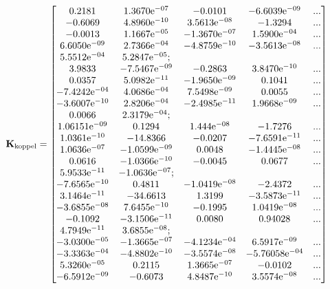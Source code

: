 \begin{equation*}
{\ensuremath{\boldsymbol{\mathrm{K}}}}_{\textnormal{koppel}} = 
\begin{bmatrix}
0.2181 & 1.3670\mathrm{e}^{-07} & -0.0101 & -6.6039\mathrm{e}^{-09} & ... \\
-0.6069 & 4.8960\mathrm{e}^{-10} & 3.5613\mathrm{e}^{-08} & -1.3294 & ... \\
-0.0013 & 1.1667\mathrm{e}^{-05} & -1.3670\mathrm{e}^{-07} & 1.5900\mathrm{e}^{-04} & ... \\
6.6050\mathrm{e}^{-09} & 2.7366\mathrm{e}^{-04} & -4.8759\mathrm{e}^{-10} & -3.5613\mathrm{e}^{-08} & ... \\
5.5512\mathrm{e}^{-04} & 5.2847\mathrm{e}^{-05}; & & \\ 
3.9833 & -7.5467\mathrm{e}^{-09} & -0.2863 & 3.8470\mathrm{e}^{-10} & ... \\ 
0.0357 & 5.0982\mathrm{e}^{-11} & -1.9650\mathrm{e}^{-09} & 0.1041 & ... \\
-7.4242\mathrm{e}^{-04} & 4.0686\mathrm{e}^{-04} & 7.5498\mathrm{e}^{-09} & 0.0055 & ... \\
-3.6007\mathrm{e}^{-10} & 2.8206\mathrm{e}^{-04} & -2.4985\mathrm{e}^{-11} & 1.9668\mathrm{e}^{-09} & ... \\
0.0066 & 2.3179\mathrm{e}^{-04}; & & \\ 
1.06151\mathrm{e}^{-09} & 0.1294 & 1.444\mathrm{e}^{-08} & -1.7276 & ... \\
1.0361\mathrm{e}^{-10} & -14.8366 & -0.0207 & -7.6591\mathrm{e}^{-11} & ... \\
1.0636\mathrm{e}^{-07} & -1.0599\mathrm{e}^{-09} & 0.0048 & -1.4445\mathrm{e}^{-08} & ... \\
0.0616 & -1.0366\mathrm{e}^{-10} & -0.0045 & 0.0677 & ... \\
5.9533\mathrm{e}^{-11} & -1.0636\mathrm{e}^{-07}; & & \\
-7.6565\mathrm{e}^{-10} & 0.4811 & -1.0419\mathrm{e}^{-08} & -2.4372 & ... \\
3.1464\mathrm{e}^{-11} & -34.6613 & 1.3199 & -3.5873\mathrm{e}^{-11} & ... \\
-3.6855\mathrm{e}^{-08} & 7.6455\mathrm{e}^{-10} & -0.1995 & 1.0419\mathrm{e}^{-08} & ... \\
-0.1092 & -3.1506\mathrm{e}^{-11} & 0.0080 & 0.94028 & ... \\
4.7949\mathrm{e}^{-11} & 3.6855\mathrm{e}^{-08}; & & \\
-3.0300\mathrm{e}^{-05} & -1.3665\mathrm{e}^{-07} & -4.1234\mathrm{e}^{-04} & 6.5917\mathrm{e}^{-09} & ... \\
-3.3363\mathrm{e}^{-04} & -4.8802\mathrm{e}^{-10} & -3.5574\mathrm{e}^{-08} & -5.76058\mathrm{e}^{-04} & ... \\
5.3260\mathrm{e}^{-05} & 0.2115 & 1.3665\mathrm{e}^{-07} & -0.0102 & ... \\
-6.5912\mathrm{e}^{-09} & -0.6073 & 4.8487\mathrm{e}^{-10} & 3.5574\mathrm{e}^{-08} & ... \\

\end{bmatrix}
\end{equation*}
